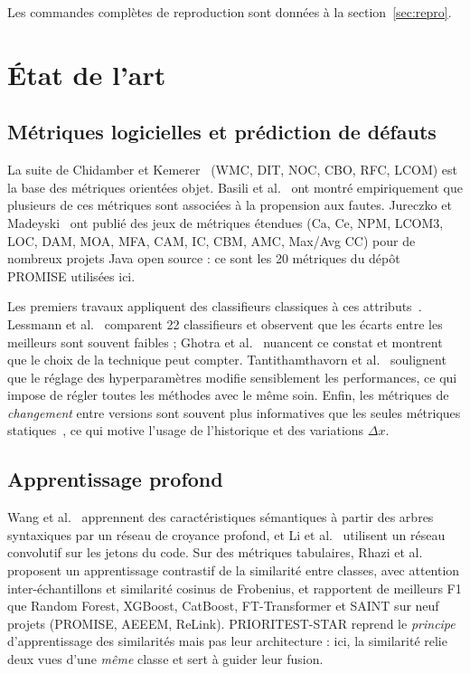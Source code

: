 \documentclass[11pt,a4paper,openany]{report}
\begin{document}
\noindent Les commandes complètes de reproduction sont données à la section~\ref{sec:repro}.

\chapter{État de l'art}

\section{Métriques logicielles et prédiction de défauts}
La suite de Chidamber et Kemerer~\cite{ck1994} (WMC, DIT, NOC, CBO, RFC, LCOM) est la base des métriques orientées
objet. Basili et al.~\cite{basili1996} ont montré empiriquement que plusieurs de ces métriques sont associées à la
propension aux fautes. Jureczko et Madeyski~\cite{jureczko2010} ont publié des jeux de métriques étendues (Ca, Ce,
NPM, LCOM3, LOC, DAM, MOA, MFA, CAM, IC, CBM, AMC, Max/Avg CC) pour de nombreux projets Java open source : ce sont
les 20 métriques du dépôt PROMISE utilisées ici.

Les premiers travaux appliquent des classifieurs classiques à ces attributs~\cite{menzies2007}.
Lessmann et al.~\cite{lessmann2008} comparent 22 classifieurs et observent que les écarts entre les meilleurs sont
souvent faibles ; Ghotra et al.~\cite{ghotra2015} nuancent ce constat et montrent que le choix de la technique peut
compter. Tantithamthavorn et al.~\cite{tantithamthavorn2016} soulignent que le réglage des hyperparamètres modifie
sensiblement les performances, ce qui impose de régler toutes les méthodes avec le même soin. Enfin, les métriques de
\emph{changement} entre versions sont souvent plus informatives que les seules métriques statiques~\cite{moser2008},
ce qui motive l'usage de l'historique et des variations $\Delta x$.

\section{Apprentissage profond}
Wang et al.~\cite{wang2016} apprennent des caractéristiques sémantiques à partir des arbres syntaxiques par un réseau
de croyance profond, et Li et al.~\cite{li2017} utilisent un réseau convolutif sur les jetons du code.
Sur des métriques tabulaires, Rhazi et al.~\cite{rhazi2026} proposent un apprentissage contrastif de la similarité
entre classes, avec attention inter-échantillons et similarité cosinus de Frobenius, et rapportent de meilleurs F1
que Random Forest, XGBoost, CatBoost, FT-Transformer et SAINT sur neuf projets (PROMISE, AEEEM, ReLink).
PRIORITEST-STAR reprend le \emph{principe} d'apprentissage des similarités mais pas leur architecture : ici, la
similarité relie deux vues d'une \emph{même} classe et sert à guider leur fusion.
\end{document}
